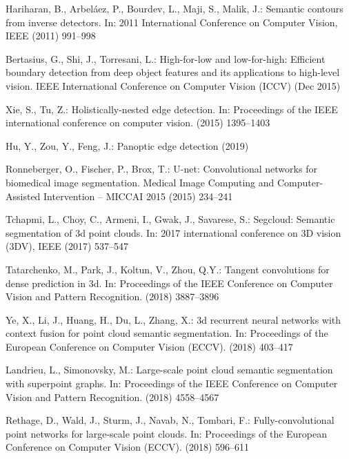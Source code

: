 \documentclass[runningheads]{llncs}
\begin{document}
\begin{thebibliography}{10}
Hariharan, B., Arbel{\'a}ez, P., Bourdev, L., Maji, S., Malik, J.:
\newblock Semantic contours from inverse detectors.
\newblock In: 2011 International Conference on Computer Vision, IEEE (2011)
  991--998

Bertasius, G., Shi, J., Torresani, L.:
\newblock High-for-low and low-for-high: Efficient boundary detection from deep
  object features and its applications to high-level vision.
 IEEE International Conference on Computer Vision (ICCV) (Dec
  2015)

Xie, S., Tu, Z.:
\newblock Holistically-nested edge detection.
\newblock In: Proceedings of the IEEE international conference on computer
  vision. (2015)  1395--1403

Hu, Y., Zou, Y., Feng, J.:
\newblock Panoptic edge detection (2019)

Ronneberger, O., Fischer, P., Brox, T.:
\newblock U-net: Convolutional networks for biomedical image segmentation.
\newblock Medical Image Computing and Computer-Assisted Intervention – MICCAI
  2015 (2015)  234–241

Tchapmi, L., Choy, C., Armeni, I., Gwak, J., Savarese, S.:
\newblock Segcloud: Semantic segmentation of 3d point clouds.
\newblock In: 2017 international conference on 3D vision (3DV), IEEE (2017)
  537--547

Tatarchenko, M., Park, J., Koltun, V., Zhou, Q.Y.:
\newblock Tangent convolutions for dense prediction in 3d.
\newblock In: Proceedings of the IEEE Conference on Computer Vision and Pattern
  Recognition. (2018)  3887--3896

Ye, X., Li, J., Huang, H., Du, L., Zhang, X.:
\newblock 3d recurrent neural networks with context fusion for point cloud
  semantic segmentation.
\newblock In: Proceedings of the European Conference on Computer Vision (ECCV).
  (2018)  403--417

Landrieu, L., Simonovsky, M.:
\newblock Large-scale point cloud semantic segmentation with superpoint graphs.
\newblock In: Proceedings of the IEEE Conference on Computer Vision and Pattern
  Recognition. (2018)  4558--4567

Rethage, D., Wald, J., Sturm, J., Navab, N., Tombari, F.:
\newblock Fully-convolutional point networks for large-scale point clouds.
\newblock In: Proceedings of the European Conference on Computer Vision (ECCV).
  (2018)  596--611


\end{thebibliography}
\end{document}
